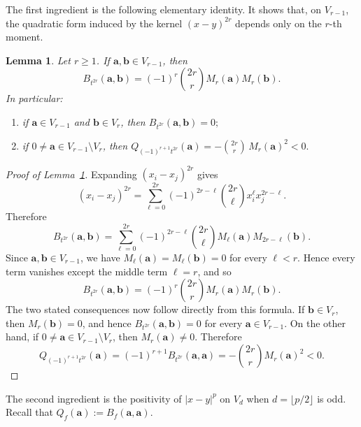 \documentclass[11pt]{article}
\newtheorem{lemma}[theorem]{Lemma}
\theoremstyle{definition}
\begin{document}
The first ingredient is the following elementary identity.  It shows that, on
\(V_{r-1}\), the quadratic form induced by the kernel \((x-y)^{2r}\) depends only
on the \(r\)-th moment.
\begin{lemma}\label{lem mom0}
	Let $r\ge 1$. If $\boldsymbol{a},\boldsymbol{b}\in V_{r-1}$, then
	\[
	B_{t^{2r}}(\boldsymbol{a},\boldsymbol{b})
	=
	(-1)^r\binom{2r}{r}M_r(\boldsymbol{a})M_r(\boldsymbol{b}).
	\]
	In particular:
	\begin{enumerate}
		\item[\textup{(1)}] if $\boldsymbol{a}\in V_{r-1}$ and $\boldsymbol{b}\in V_r$, then
		\(
		B_{t^{2r}}(\boldsymbol{a},\boldsymbol{b})=0;
		\)
		
		\item[\textup{(2)}] if $0\ne \boldsymbol{a}\in V_{r-1}\setminus V_r$, then
		\(
		Q_{(-1)^{r+1}t^{2r}}(\boldsymbol{a})
		=
		-\binom{2r}{r}\,M_r(\boldsymbol{a})^2<0.
		\)
	\end{enumerate}
\end{lemma}
\begin{proof}[Proof of Lemma~\ref{lem mom0}]
	Expanding $(x_i-x_j)^{2r}$ gives
	\[
	(x_i-x_j)^{2r}
	=
	\sum_{\ell=0}^{2r}(-1)^{2r-\ell}\binom{2r}{\ell}x_i^\ell x_j^{2r-\ell}.
	\]
	Therefore
	\[
	B_{t^{2r}}(\boldsymbol{a},\boldsymbol{b})
	=
	\sum_{\ell=0}^{2r}(-1)^{2r-\ell}\binom{2r}{\ell}
	M_\ell(\boldsymbol{a})M_{2r-\ell}(\boldsymbol{b}).
	\]
	Since $\boldsymbol{a},\boldsymbol{b}\in V_{r-1}$, we have
	\(
	M_\ell(\boldsymbol{a})=M_\ell(\boldsymbol{b})=0\)
	for every \(\ell<r.\)
	Hence every term vanishes except the middle term $\ell=r$, and so
	\[
	B_{t^{2r}}(\boldsymbol{a},\boldsymbol{b})
	=
	(-1)^r\binom{2r}{r}M_r(\boldsymbol{a})M_r(\boldsymbol{b}).
	\]
	The two stated consequences now follow directly from this formula. If \(\boldsymbol{b}\in V_r\), then \(M_r(\boldsymbol{b})=0\), and hence \( B_{t^{2r}}(\boldsymbol{a},\boldsymbol{b})=0 \)
    for every \(\boldsymbol{a}\in V_{r-1}\). 
    On the other hand, if \(0\ne\boldsymbol{a}\in V_{r-1}\setminus V_r\), then \(M_r(\boldsymbol{a})\ne0\). Therefore \[ Q_{(-1)^{r+1}t^{2r}}(\boldsymbol{a}) = (-1)^{r+1}B_{t^{2r}}(\boldsymbol{a},\boldsymbol{a}) = -\binom{2r}{r}M_r(\boldsymbol{a})^2<0. \]
\end{proof}

The second ingredient is the positivity of $|x-y|^p$ on $V_d$ when
$d=\lfloor p/2\rfloor$ is odd. Recall that \(Q_f(\boldsymbol{a}):=B_f(\boldsymbol{a},\boldsymbol{a}).\)
\end{document}
